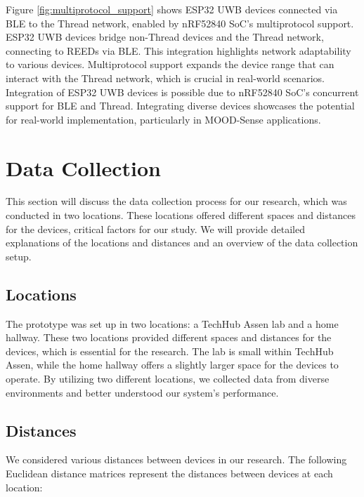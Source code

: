 Figure \ref{fig:multiprotocol_support} shows ESP32 UWB devices connected via BLE to the Thread network, enabled by nRF52840 SoC's multiprotocol support. ESP32 UWB devices bridge non-Thread devices and the Thread network, connecting to REEDs via BLE. This integration highlights network adaptability to various devices. Multiprotocol support expands the device range that can interact with the Thread network, which is crucial in real-world scenarios. Integration of ESP32 UWB devices is possible due to nRF52840 SoC's concurrent support for BLE and Thread. Integrating diverse devices showcases the potential for real-world implementation, particularly in MOOD-Sense applications.


\section{Data Collection}\label{sec:data_collection}
This section will discuss the data collection process for our research, which was conducted in two locations. These locations offered different spaces and distances for the devices, critical factors for our study. We will provide detailed explanations of the locations and distances and an overview of the data collection setup.

\subsection{Locations}\label{sec:locations}
The prototype was set up in two locations: a TechHub Assen lab and a home hallway. These two locations provided different spaces and distances for the devices, which is essential for the research. The lab is small within TechHub Assen, while the home hallway offers a slightly larger space for the devices to operate. By utilizing two different locations, we collected data from diverse environments and better understood our system's performance.

\subsection{Distances}\label{sec:distances}
We considered various distances between devices in our research. The following Euclidean distance matrices represent the distances between devices at each location:


